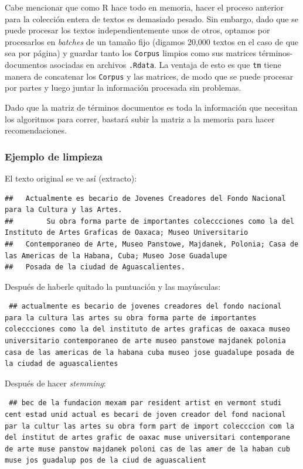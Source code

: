 Cabe mencionar que como R hace todo en memoria, hacer el proceso
anterior para la colección entera de textos es demasiado pesado. Sin
embargo, dado que se puede procesar los textos independientemente unos
de otros, optamos por procesarlos en \emph{batches} de un tamaño fijo
(digamos 20,000 textos en el caso de que sea por página) y guardar tanto
los \texttt{Corpus} limpios como sus matrices términos-documentos
asociadas en archivos \texttt{.Rdata}. La ventaja de esto es que
\texttt{tm} tiene manera de concatenar los \texttt{Corpus} y las
matrices, de modo que se puede procesar por partes y luego juntar la
información procesada sin problemas.

Dado que la matriz de términos documentos es toda la información que
necesitan los algoritmos para correr, bastará subir la matriz a la
memoria para hacer recomendaciones.

\subsubsection{Ejemplo de limpieza}\label{ejemplo-de-limpieza}

El texto original se ve así (extracto):

\begin{lstlisting}
##   Actualmente es becario de Jovenes Creadores del Fondo Nacional para la Cultura y las Artes.
##        Su obra forma parte de importantes coleccciones como la del Instituto de Artes Graficas de Oaxaca; Museo Universitario
##   Contemporaneo de Arte, Museo Panstowe, Majdanek, Polonia; Casa de las Americas de la Habana, Cuba; Museo Jose Guadalupe
##   Posada de la ciudad de Aguascalientes.
\end{lstlisting}

Después de haberle quitado la puntuación y las mayúsculas:

\begin{lstlisting}
 ## actualmente es becario de jovenes creadores del fondo nacional para la cultura las artes su obra forma parte de importantes coleccciones como la del instituto de artes graficas de oaxaca museo universitario contemporaneo de arte museo panstowe majdanek polonia casa de las americas de la habana cuba museo jose guadalupe posada de la ciudad de aguascalientes
\end{lstlisting}

Después de hacer \emph{stemming}:

\begin{lstlisting}
 ## bec de la fundacion mexam par resident artist en vermont studi cent estad unid actual es becari de joven creador del fond nacional par la cultur las artes su obra form part de import colecccion com la del institut de artes grafic de oaxac muse universitari contemporane de arte muse panstow majdanek poloni cas de las amer de la haban cub muse jos guadalup pos de la ciud de aguascalient
\end{lstlisting}

